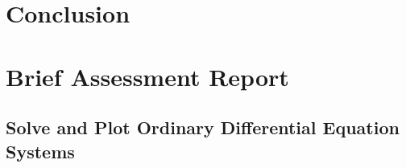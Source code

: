 \documentclass{mcmthesis}
\begin{document}
\section{Conclusion}\label{S8}


\newpage





\section*{Brief Assessment Report}\label{S9}

\newpage

\begin{appendices}

\section{Solve and Plot Ordinary Differential Equation Systems}


\end{appendices}


\newpage



    
    
\end{document}
